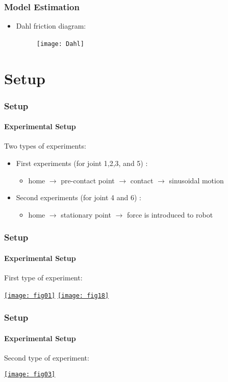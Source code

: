 \documentclass[12pt,english]{beamer}
\begin{document}
  \begin{frame}
    \frametitle{Model Estimation}
    \begin{itemize}
      \item Dahl friction diagram:
      \begin{figure}
        \texttt{[image: Dahl]} \,
      \end{figure}
    \end{itemize}
  \end{frame}
  
  \section{Setup}
  \begin{frame}
    \frametitle{Setup}
    \framesubtitle{Experimental Setup}
    Two types of experiments:
    \begin{itemize}
    \item First experiments (for joint 1,2,3, and 5) :
      \begin{itemize}
        \item home $\rightarrow$ pre-contact point $\rightarrow$ contact $\rightarrow$ sinusoidal motion
      \end{itemize}
    \item Second experiments (for joint 4 and 6) :
      \begin{itemize}
        \item home $\rightarrow$ stationary point $\rightarrow$ force is introduced to robot
      \end{itemize}
    \end{itemize}
  \end{frame}
  
  \begin{frame}
    \frametitle{Setup}
    \framesubtitle{Experimental Setup}
    First type of experiment:
    \begin{center}
      \href{run:exp_1.ogv}{\texttt{[image: fig01]}}
      \href{run:exp_2.ogv}{\texttt{[image: fig18]}}
    \end{center}
  \end{frame}
  
  \begin{frame}
    \frametitle{Setup}
    \framesubtitle{Experimental Setup}
    Second type of experiment:
    \begin{center}
      \href{run:exp_3.ogv}{\texttt{[image: fig03]}}
    \end{center}
  \end{frame}
  
\end{document}
